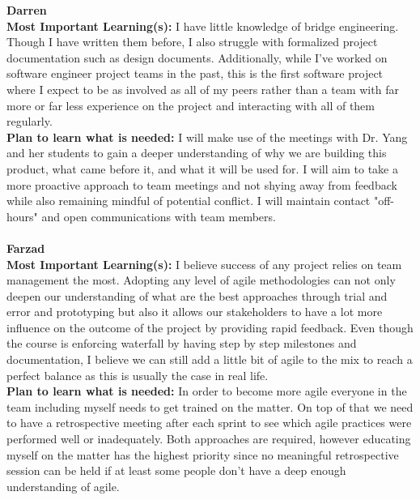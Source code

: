 \documentclass[12pt]{article}
\begin{document}
\noindent\textbf{Darren}\\
\textbf{Most Important Learning(s):} I have little knowledge of bridge engineering. Though I have written them before, I also struggle with formalized project documentation such as design documents. Additionally, while I've worked on software engineer project teams in the past, this is the first software project where I expect to be as involved as all of my peers rather than a team with far more or far less experience on the project and interacting with all of them regularly.\\
\textbf{Plan to learn what is needed:} I will make use of the meetings with Dr. Yang and her students to gain a deeper understanding of why we are building this product, what came before it, and what it will be used for. I will aim to take a more proactive approach to team meetings and not shying away from feedback while also remaining mindful of potential conflict. I will maintain contact "off-hours" and open communications with team members.\\\\

\noindent\textbf{Farzad}\\
\textbf{Most Important Learning(s):} I believe success of any project relies on team management the most. Adopting any level of agile methodologies can not only deepen our understanding of what are the best approaches through trial and error and prototyping but also it allows our stakeholders to have a lot more influence on the outcome of the project by providing rapid feedback. Even though the course is enforcing waterfall by having step by step milestones and documentation, I believe we can still add a little bit of agile to the mix to reach a perfect balance as this is usually the case in real life.\\
\textbf{Plan to learn what is needed:} In order to become more agile everyone in the team including myself needs to get trained on the matter. On top of that we need to have a retrospective meeting after each sprint to see which agile practices were performed well or inadequately. Both approaches are required, however educating myself on the matter has the highest priority since no meaningful retrospective session can be held if at least some people don't have a deep enough understanding of agile.\\\\
\end{document}
